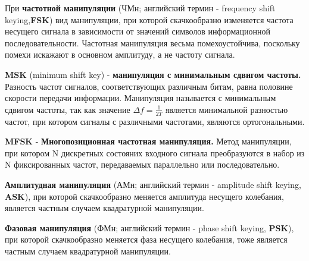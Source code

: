 \documentclass[a4paper,12pt]{article}
\begin{document}
При \textbf{частотной манипуляции} (ЧМн; английский термин - frequency shift keying,\textbf{FSK}) вид манипуляции, при которой скачкообразно изменяется частота несущего сигнала в зависимости от значений символов информационной последовательности. Частотная манипуляция весьма помехоустойчива, поскольку помехи искажают в основном амплитуду, а не частоту сигнала.

\textbf{MSK} (minimum shift key) - \textbf{манипуляция с минимальным сдвигом частоты.} Разность частот сигналов, соответствующих различным битам, равна половине скорости передачи информации. Манипуляция называется с минимальным сдвигом частоты, так как значение $\Delta f = \frac{1}{2T}$ является минимальной разностью частот, при котором сигналы с различными частотами, являются ортогональными. 

\textbf{MFSK} - \textbf{Многопозиционная частотная манипуляция.} Метод манипуляции, при котором N дискретных состояних входного сигнала преобразуются в набор из N фиксированных частот, передаваемых параллельно или последовательно.

\textbf{Амплитудная манипуляция} (АМн; английский термин - amplitude shift keying, \textbf{ASK}), при которой скачкообразно меняется амплитуда несущего колебания, является частным случаем квадратурной манипуляции.

\textbf{Фазовая манипуляция} (ФМн; английский термин - phase shift keying, \textbf{PSK}), при которой скачкообразно меняется фаза несущего колебания, тоже является частным случаем квадратурной манипуляции.
\newpage
\end{document}
